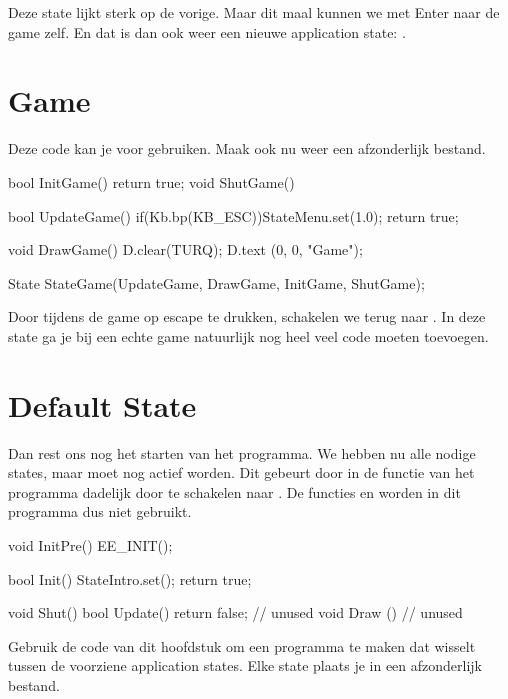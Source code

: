 Deze state lijkt sterk op de vorige. Maar dit maal kunnen we met Enter naar de game zelf. En dat is dan ook weer een nieuwe application state: .

\section{Game}
Deze code kan je voor  gebruiken. Maak ook nu weer een afzonderlijk bestand.
\begin{code}
bool InitGame() {return true;}
void ShutGame() {}

bool UpdateGame()
{
   if(Kb.bp(KB_ESC))StateMenu.set(1.0);
   return true;
}

void DrawGame()
{
   D.clear(TURQ);
   D.text (0, 0, "Game");
}

State StateGame(UpdateGame, DrawGame, InitGame, ShutGame);
\end{code}

Door tijdens de game op escape te drukken, schakelen we terug naar . In deze state ga je bij een echte game natuurlijk nog heel veel code moeten toevoegen.

\section{Default State}
Dan rest ons nog het starten van het programma. We hebben nu alle nodige states, maar  moet nog actief worden. Dit gebeurt door in de  functie van het programma dadelijk door te schakelen naar . De functies  en  worden in dit programma dus niet gebruikt.

\begin{code}
void InitPre()
{
   EE_INIT();
}

bool Init()
{
   StateIntro.set();
   return true;
}

void Shut() {}
bool Update() {return false;} // unused
void Draw  () {             } // unused
\end{code}

\begin{exercise}
Gebruik de code van dit hoofdstuk om een programma te maken dat wisselt tussen de voorziene application states. Elke state plaats je in een afzonderlijk bestand.
\end{exercise}
